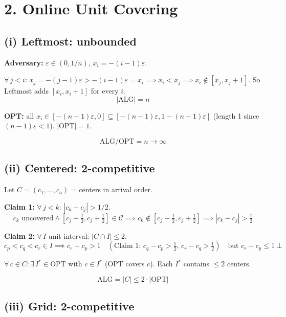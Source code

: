 \documentclass[11pt]{article}
\begin{document}
\section*{2. Online Unit Covering}

\vspace{-10pt}
\subsection*{(i) Leftmost: unbounded}

\textbf{Adversary:} $\varepsilon \in (0, 1/n)$, $x_i = -(i-1)\varepsilon$.

$\forall\, j < i$: $x_j = -(j{-}1)\varepsilon > -(i{-}1)\varepsilon = x_i \implies x_i < x_j \implies x_i \notin [x_j, x_j{+}1]$. So Leftmost adds $[x_i, x_i{+}1]$ for every $i$.
\[
|\mathrm{ALG}| = n
\]

\textbf{OPT:} all $x_i \in [-(n{-}1)\varepsilon, 0] \subseteq [-(n{-}1)\varepsilon, 1{-}(n{-}1)\varepsilon]$ (length 1 since $(n-1)\varepsilon < 1$). $|\mathrm{OPT}| = 1$.

\vspace{-8pt}
\[\boxed{\mathrm{ALG}/\mathrm{OPT} = n \to \infty}\]

\vspace{-20pt}
\subsection*{(ii) Centered: 2-competitive}

Let $C = (c_1, \ldots, c_a)$ = centers in arrival order.

\textbf{Claim 1:} $\forall\, j < k$: $|c_k - c_j| > 1/2$.
\[
c_k \text{ uncovered} \wedge [c_j - \tfrac{1}{2}, c_j + \tfrac{1}{2}] \in \mathcal{C} \implies c_k \notin [c_j - \tfrac{1}{2}, c_j + \tfrac{1}{2}] \implies |c_k - c_j| > \tfrac{1}{2}
\]

\textbf{Claim 2:} $\forall\, I$ unit interval: $|C \cap I| \le 2$.
\[
c_p < c_q < c_r \in I \implies c_r - c_p > 1 \quad (\text{Claim 1: } c_q{-}c_p > \tfrac{1}{2},\, c_r{-}c_q > \tfrac{1}{2}) \quad \text{but } c_r - c_p \le 1 \;\bot
\]

$\forall\, c \in C: \exists\, I^* \in \mathrm{OPT}$ with $c \in I^*$ (OPT covers $c$). Each $I^*$ contains $\le 2$ centers.

\vspace{-8pt}
\[\boxed{\mathrm{ALG} = |C| \le 2 \cdot |\mathrm{OPT}|}\]

\vspace{-20pt}
\subsection*{(iii) Grid: 2-competitive}
\end{document}
